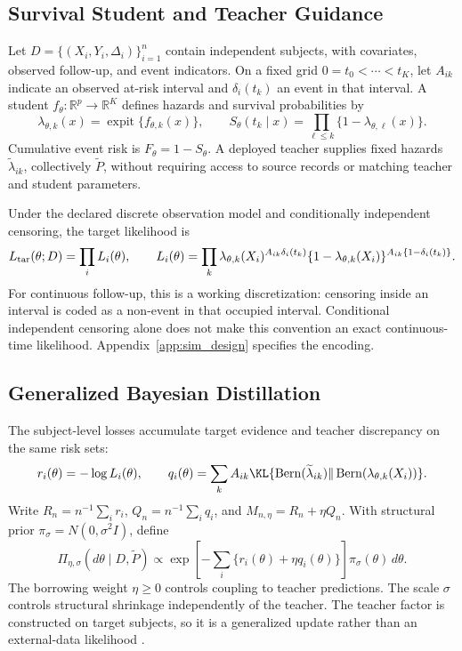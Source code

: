 \documentclass{article} %
\DeclareMathOperator{\expit}{expit}
\begin{document}
\subsection{Survival Student and Teacher Guidance}
\label{sec:model-interface}
Let $D=\{(X_i,Y_i,\Delta_i)\}_{i=1}^n$ contain independent subjects, with covariates, observed follow-up, and event indicators. On a fixed grid $0=t_0<\cdots<t_K$, let $A_{ik}$ indicate an observed at-risk interval and $\delta_i(t_k)$ an event in that interval. A student $f_\theta:\mathbb R^p\to\mathbb R^K$ defines hazards and survival probabilities by
\begin{equation}
\lambda_{\theta,k}(x)=\expit\{f_{\theta,k}(x)\},\qquad
S_\theta(t_k\mid x)=\prod_{\ell\le k}\{1-\lambda_{\theta,\ell}(x)\}.
\label{eq:survival-functionals-main}
\end{equation}
Cumulative event risk is $F_\theta=1-S_\theta$. A deployed teacher supplies fixed hazards $\widetilde\lambda_{ik}$, collectively $\widetilde P$, without requiring access to source records or matching teacher and student parameters.

Under the declared discrete observation model and conditionally independent censoring, the target likelihood is
\begin{equation}
L_{\rm tar}(\theta;D)=\prod_i L_i(\theta),\qquad
L_i(\theta)=\prod_k\lambda_{\theta,k}(X_i)^{A_{ik}\delta_i(t_k)}
\{1-\lambda_{\theta,k}(X_i)\}^{A_{ik}\{1-\delta_i(t_k)\}}.
\label{eq:target-likelihood-main}
\end{equation}
For continuous follow-up, this is a working discretization: censoring inside an interval is coded as a non-event in that occupied interval. Conditional independent censoring alone does not make this convention an exact continuous-time likelihood. Appendix~\ref{app:sim_design} specifies the encoding.

\subsection{Generalized Bayesian Distillation}
\label{sec:generalized-update}
The subject-level losses accumulate target evidence and teacher discrepancy on the same risk sets:
\begin{equation}
 r_i(\theta)=-\log L_i(\theta),\qquad
 q_i(\theta)=\sum_k A_{ik}\KL\{\operatorname{Bern}(\widetilde\lambda_{ik})
 \Vert\operatorname{Bern}(\lambda_{\theta,k}(X_i))\}.
\label{eq:subject-losses-main}
\end{equation}
Write $R_n=n^{-1}\sum_i r_i$, $Q_n=n^{-1}\sum_i q_i$, and $M_{n,\eta}=R_n+\eta Q_n$. With structural prior $\pi_\sigma=N(0,\sigma^2I)$, define
\begin{equation}
\Pi_{\eta,\sigma}(d\theta\mid D,\widetilde P)
\propto\exp\!\left[-\sum_i\{r_i(\theta)+\eta q_i(\theta)\}\right]\pi_\sigma(\theta)\,d\theta.
\label{eq:bayesian-diskd-posterior}
\end{equation}
The borrowing weight $\eta\ge0$ controls coupling to teacher predictions. The scale $\sigma$ controls structural shrinkage independently of the teacher. The teacher factor is constructed on target subjects, so it is a generalized update rather than an external-data likelihood \citep{bissiri2016general}.
\end{document}
